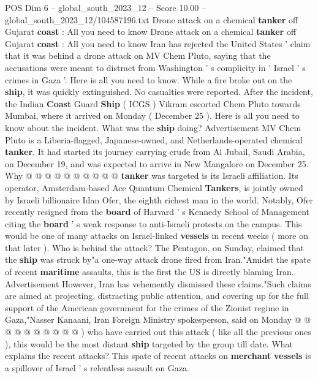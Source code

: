 \begin{textsample}{POS Dim 6 – global\_south\_2023\_12 – Score 10.00 – global\_south\_2023\_12/104587196.txt}  \label{ex:f6_pos_106}
Drone attack on a chemical \textbf{tanker} off Gujarat \textbf{coast} : All you need to know Drone attack on a chemical \textbf{tanker} off Gujarat \textbf{coast} : All you need to know Iran has rejected the United States ' claim that it was behind a drone attack on MV Chem Pluto, saying that the accusations were meant to distract from Washington ' s complicity in ' Israel ' s crimes in Gaza '.
Here is all you need to know.
While a fire broke out on the \textbf{ship}, it was quickly extinguished.
No casualties were reported.
After the incident, the Indian \textbf{Coast} Guard \textbf{Ship} ( ICGS ) Vikram escorted Chem Pluto towards Mumbai, where it arrived on Monday ( December 25 ).
Here is all you need to know about the incident.
What was the \textbf{ship} doing?
Advertisement MV Chem Pluto is a Liberia-flagged, Japanese-owned, and Netherlands-operated chemical \textbf{tanker}.
It had started its journey carrying crude from Al Jubail, Saudi Arabia, on December 19, and was expected to arrive in New Mangalore on December 25.
Why @ @ @ @ @ @ @ @ @ @ \textbf{tanker} was targeted is its Israeli affiliation.
Its operator, Amsterdam-based Ace Quantum Chemical \textbf{Tankers}, is jointly owned by Israeli billionaire Idan Ofer, the eighth richest man in the world.
Notably, Ofer recently resigned from the \textbf{board} of Harvard ' s Kennedy School of Management citing the \textbf{board} ' s weak response to anti-Israeli protests on the campus.
This would be one of many attacks on Israel-linked \textbf{vessels} in recent weeks ( more on that later ).
Who is behind the attack?
The Pentagon, on Sunday, claimed that the \textbf{ship} was struck by"a one-way attack drone fired from Iran."Amidst the spate of recent \textbf{maritime} assaults, this is the first the US is directly blaming Iran.
Advertisement However, Iran has vehemently dismissed these claims."Such claims are aimed at projecting, distracting public attention, and covering up for the full support of the American government for the crimes of the Zionist regime in Gaza,"Nasser Kanaani, Iran Foreign Ministry spokesperson, said on Monday @ @ @ @ @ @ @ @ @ @ ) who have carried out this attack ( like all the previous ones ), this would be the most distant \textbf{ship} targeted by the group till date.
What explains the recent attacks?
This spate of recent attacks on \textbf{merchant} \textbf{vessels} is a spillover of Israel ' s relentless assault on Gaza.

\end{textsample}
